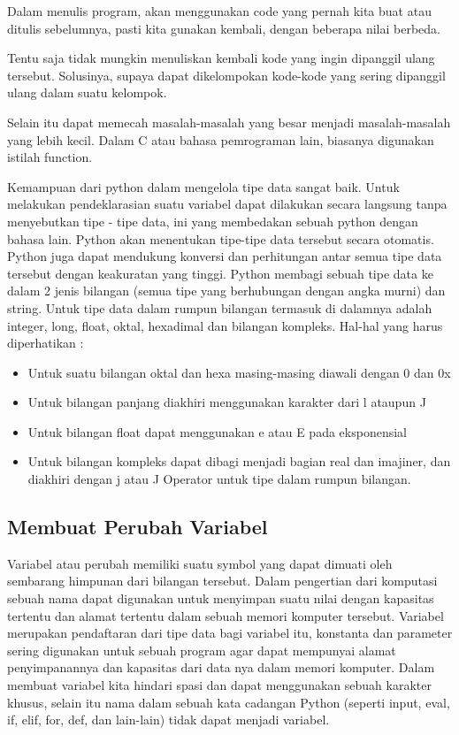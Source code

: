 Dalam menulis program, akan menggunakan code yang pernah kita  buat atau ditulis sebelumnya, pasti
kita gunakan kembali, dengan beberapa nilai berbeda.
 
Tentu saja tidak mungkin menuliskan kembali kode yang ingin dipanggil ulang tersebut.
Solusinya, supaya dapat dikelompokan kode-kode yang sering dipanggil ulang dalam suatu kelompok.

Selain itu dapat memecah masalah-masalah yang besar  menjadi masalah-masalah yang lebih kecil.
Dalam C atau bahasa pemrograman lain, biasanya digunakan istilah function.

Kemampuan dari python dalam mengelola tipe data sangat baik. Untuk melakukan pendeklarasian suatu variabel dapat dilakukan secara langsung tanpa menyebutkan tipe - tipe data, ini yang membedakan sebuah python dengan bahasa lain. Python akan menentukan tipe-tipe data tersebut secara otomatis. Python juga dapat mendukung konversi dan perhitungan antar semua tipe data tersebut dengan keakuratan yang tinggi. Python membagi sebuah tipe data ke dalam 2 jenis bilangan (semua tipe yang berhubungan dengan angka murni) dan string. Untuk tipe data dalam rumpun bilangan termasuk di dalamnya adalah integer, long, float, oktal, hexadimal dan bilangan kompleks. Hal-hal yang harus diperhatikan :
\begin{itemize}
\item
Untuk suatu bilangan oktal dan hexa masing-masing diawali dengan 0 dan 0x
\item
Untuk bilangan panjang diakhiri menggunakan karakter dari l ataupun J
\item
Untuk bilangan float dapat menggunakan e atau E pada eksponensial
\item
Untuk bilangan kompleks dapat dibagi menjadi bagian real dan imajiner, dan diakhiri dengan j atau J Operator untuk tipe dalam rumpun bilangan.\cite{utamipemrograman}
\end{itemize}

\subsection{Membuat Perubah Variabel}
Variabel atau perubah memiliki suatu symbol yang dapat dimuati oleh sembarang himpunan dari bilangan tersebut. Dalam pengertian dari komputasi sebuah nama dapat digunakan untuk menyimpan suatu nilai dengan kapasitas tertentu dan alamat tertentu dalam sebuah memori komputer tersebut. Variabel merupakan pendaftaran dari tipe data bagi variabel itu, konstanta dan parameter sering digunakan untuk sebuah program agar dapat mempunyai alamat penyimpanannya dan kapasitas dari data nya dalam memori komputer. Dalam membuat variabel kita hindari spasi dan dapat menggunakan sebuah karakter khusus, selain itu nama dalam sebuah kata cadangan Python (seperti input, eval, if, elif, for, def, dan lain-lain) tidak dapat menjadi variabel.\cite{irfani2016bahan}

